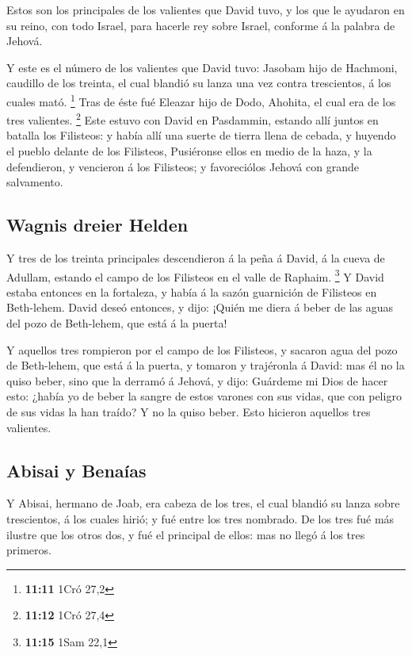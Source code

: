  Estos son los principales de los valientes que David
tuvo, y los que le ayudaron en su reino, con todo Israel, para hacerle
rey sobre Israel, conforme á la palabra de Jehová.

 Y este es el número de los valientes que David tuvo:
Jasobam hijo de Hachmoni, caudillo de los treinta, el cual blandió su
lanza una vez contra trescientos, á los cuales mató. \footnote{\textbf{11:11}
  1Cró 27,2}  Tras de éste fué Eleazar hijo de Dodo,
Ahohita, el cual era de los tres valientes. \footnote{\textbf{11:12}
  1Cró 27,4}  Este estuvo con David en Pasdammin, estando
allí juntos en batalla los Filisteos: y había allí una suerte de tierra
llena de cebada, y huyendo el pueblo delante de los Filisteos,
 Pusiéronse ellos en medio de la haza, y la defendieron,
y vencieron á los Filisteos; y favoreciólos Jehová con grande
salvamento.

\hypertarget{wagnis-dreier-helden}{%
\subsection{Wagnis dreier Helden}\label{wagnis-dreier-helden}}

 Y tres de los treinta principales descendieron á la peña
á David, á la cueva de Adullam, estando el campo de los Filisteos en el
valle de Raphaim. \footnote{\textbf{11:15} 1Sam 22,1}  Y
David estaba entonces en la fortaleza, y había á la sazón guarnición de
Filisteos en Beth-lehem.  David deseó entonces, y dijo:
¡Quién me diera á beber de las aguas del pozo de Beth-lehem, que está á
la puerta!

 Y aquellos tres rompieron por el campo de los Filisteos,
y sacaron agua del pozo de Beth-lehem, que está á la puerta, y tomaron y
trajéronla á David: mas él no la quiso beber, sino que la derramó á
Jehová, y dijo:  Guárdeme mi Dios de hacer esto: ¿había
yo de beber la sangre de estos varones con sus vidas, que con peligro de
sus vidas la han traído? Y no la quiso beber. Esto hicieron aquellos
tres valientes.

\hypertarget{abisai-y-benauxedas}{%
\subsection{Abisai y Benaías}\label{abisai-y-benauxedas}}

 Y Abisai, hermano de Joab, era cabeza de los tres, el
cual blandió su lanza sobre trescientos, á los cuales hirió; y fué entre
los tres nombrado.  De los tres fué más ilustre que los
otros dos, y fué el principal de ellos: mas no llegó á los tres
primeros.

